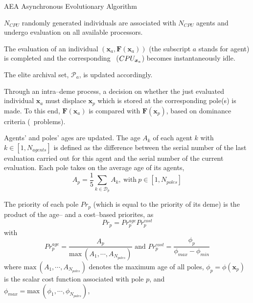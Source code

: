 \documentclass{vki_ls}
\def\Dp{\mathcal{D}_p}
\newcommand{\vect}[1]{\bm{#1}}
\newcommand{\set}[1]{\mathcal{#1}}
\begin{document}
%
\begin{namedalgorithm}{AEA}
{Asynchronous Evolutionary Algorithm}{}
\item[Start Algorithm]\label{aea:start}
$N_{CPU}$ randomly generated individuals are associated with
$N_{CPU}$ agents and undergo evaluation on all available processors.
%
\item[Receive]\label{aea:receive}
The evaluation of an individual $(\vect{x}_a,\vect{F}(\vect{x}_a))$ (the subscript $a$ stands for agent) is completed and the corresponding \CPU\ ($\CPU_{\vect{x}_a}$) becomes instantaneously idle.
%
\item[Elitism]
The elite archival set, $\set{P}_a$, is updated accordingly.
%
\item[Pole Displacement]
Through an intra--deme process, a decision on whether the just evaluated individual $\vect{x}_a$ must displace $\vect{x}_p$ which is stored at the corresponding pole(s) is made. 
To this end, $\vect{F}(\vect{x}_a)$ is compared with $\vect{F}(\vect{x}_p)$, based on dominance criteria (\MOO\ problems).
%
\item[Update Ages]
Agents' and poles' ages are updated. The age $A_k$ of each agent $k$
with $k\!\in\![1,N_{agents}]$ is defined as the difference between
the serial number of the last evaluation carried out for this agent
and the serial number of the current evaluation. Each pole takes on
the average age of its agents, 
\begin{equation}\label{aea_poleage}
    A_p = \frac{1}{5} \sum_{k \in \Dp} A_k,~\mbox{with}~p\in[1,N_{poles}]
    \nonumber
\end{equation}
%
\item[Update Priorities]
The priority of each pole $Pr_p$ (which is equal to the priority of its deme) is the product of the age-- and a cost--based priorites, as
\begin{equation}
    Pr_p=Pr_p^{age}Pr_p^{cost}
    \nonumber
\end{equation}
with
\begin{equation}
    Pr_p^{age} = \frac{A_p}{\mbox{max}~(A_1,\cdots,A_{N_{poles}})}
    \mbox{ and }   
    Pr_p^{cost}= \frac{\phi_p}{\phi_{max}-\phi_{min}}
    \nonumber
\end{equation}
%
where $\mbox{max}~(A_1,\cdots,A_{N_{poles}})$ denotes the maximum age of all poles, $\phi_p=\phi(\vect{x}_p)$ is the scalar cost function associated with pole $p$, and
$\phi_{max}=\mbox{max}~(\phi_1,\cdots,\phi_{N_{poles}})$,

\end{namedalgorithm}
\end{document}
